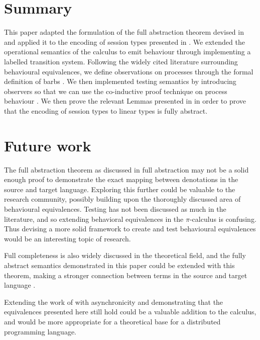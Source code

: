 

\section{Summary}

This paper adapted the formulation of the full abstraction theorem devised in \citep{demangeon2011full} and applied it to the encoding of session types presented in \cite{dardha2017session}. We extended the operational semantics of the calculus to emit behaviour through implementing a labelled transition system. Following the widely cited literature surrounding behavioural equivalences, we define observations on processes through the formal definition of barbs \cite{milner1992barbed} \cite{sangiorgi2001barbed}. We then implemented testing semantics by introducing observers \cite{10.1007/978-3-540-49382-2_9} \cite{DBLP:conf/fossacs/BorealeNP99} so that we can use the co-inductive proof technique on process behaviour \cite{coinductionSangiorgi}. We then prove the relevant Lemmas presented in \citep{demangeon2011full} in order to prove that the encoding of session types to linear types is fully abstract.

\section{Future work}

The full abstraction theorem as discussed in \citep{DBLP:journals/mscs/GorlaN16fullabsmyths} full abstraction may not be a solid enough proof to demonstrate the exact mapping between denotations in the source and target language. Exploring this further could be valuable to the research community, possibly building upon the thoroughly discussed area of behavioural equivalences. Testing has not been discussed as much in the literature, and so extending behavioral equivalences in the $\pi$-calculus is confusing. Thus devising a more solid framework to create and test behavioural equivalences would be an interesting topic of research.

Full completeness is also widely discussed in the theoretical field, and the fully abstract semantics demonstrated in this paper could be extended with this theorem, making a stronger connection between terms in the source and target language \cite{DBLP:journals/entcs/BengtsonP07}. 

Extending the work of \citep{dardha2017session} with asynchronicity and demonstrating that the equivalences presented here still hold could be a valuable addition to the calculus, and would be more appropriate for a theoretical base for a distributed programming language. 

